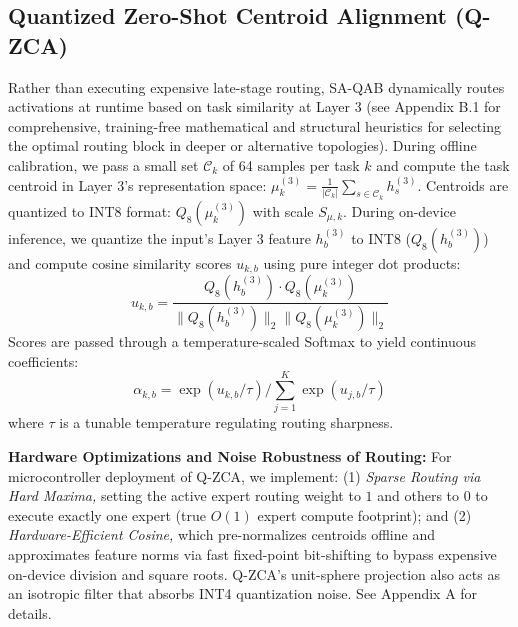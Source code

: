 \subsection{Quantized Zero-Shot Centroid Alignment (Q-ZCA)}
Rather than executing expensive late-stage routing, SA-QAB dynamically routes activations at runtime based on task similarity at Layer 3 (see Appendix B.1 for comprehensive, training-free mathematical and structural heuristics for selecting the optimal routing block in deeper or alternative topologies). During offline calibration, we pass a small set $\mathcal{C}_k$ of 64 samples per task $k$ and compute the task centroid in Layer 3's representation space: $\mu_k^{(3)} = \frac{1}{|\mathcal{C}_k|} \sum_{s \in \mathcal{C}_k} h_s^{(3)}$. Centroids are quantized to INT8 format: $Q_8(\mu_k^{(3)})$ with scale $S_{\mu, k}$.
During on-device inference, we quantize the input's Layer 3 feature $h_b^{(3)}$ to INT8 ($Q_8(h_b^{(3)})$) and compute cosine similarity scores $u_{k, b}$ using pure integer dot products:
\begin{equation}
    u_{k, b} = \frac{Q_8(h_b^{(3)}) \cdot Q_8(\mu_k^{(3)})}{\|Q_8(h_b^{(3)})\|_2 \|Q_8(\mu_k^{(3)})\|_2}
\end{equation}
Scores are passed through a temperature-scaled Softmax to yield continuous coefficients:
\begin{equation}
    \label{eq:routing_softmax}
    \alpha_{k, b} = \exp(u_{k, b} / \tau) \Big/ \sum_{j=1}^K \exp(u_{j, b} / \tau)
\end{equation}
where $\tau$ is a tunable temperature regulating routing sharpness.

\textbf{Hardware Optimizations and Noise Robustness of Routing:} For microcontroller deployment of Q-ZCA, we implement: (1) \emph{Sparse Routing via Hard Maxima,} setting the active expert routing weight to $1$ and others to $0$ to execute exactly one expert (true $O(1)$ expert compute footprint); and (2) \emph{Hardware-Efficient Cosine,} which pre-normalizes centroids offline and approximates feature norms via fast fixed-point bit-shifting to bypass expensive on-device division and square roots. Q-ZCA's unit-sphere projection also acts as an isotropic filter that absorbs INT4 quantization noise. See Appendix A for details.

